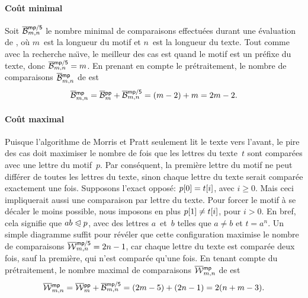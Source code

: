 \paragraph{Coût minimal}

Soit
\(\smash[t]{\OB{\fun{mp/5}}{m,n}}\)
le nombre minimal de comparaisons effectuées durant une évaluation de
, où \(m\)~est la longueur du motif et \(n\)~est la longueur
du texte. Tout comme avec la recherche na\"{\i}ve, le meilleur des cas
est quand le motif est un préfixe du texte, donc
\(\OB{\fun{mp/5}}{m,n} = m\). En prenant en compte le prétraitement,
le nombre de comparaisons
\(\OB{\fun{mp}}{m,n}\) de
 est
\begin{equation*}
\belowdisplayskip=0pt
\OB{\fun{mp}}{m,n} = \OB{\fun{pp}}{m} + \OB{\fun{mp/5}}{m,n} = (m-2)
+ m = 2m - 2.
\end{equation*}

\vspace*{-10pt}

\paragraph{Coût maximal}

Puisque l'algorithme de Morris et Pratt seulement lit le texte vers
l'avant, le pire des cas doit maximiser le nombre de fois que les
lettres du texte~\(t\) sont comparées avec une lettre du
motif~\(p\). Par conséquent, la première lettre du motif ne peut
différer de toutes les lettres du texte, sinon chaque lettre du texte
serait comparée exactement une fois. Supposons l'exact opposé:
\({p}[{0}] = {t}[{i}]\), avec \(i \geqslant 0\). Mais ceci
impliquerait aussi une comparaison par lettre du texte. Pour forcer le
motif à se décaler le moins possible, nous imposons en plus
\({p}[{1}] \neq {t}[{i}]\), pour \(i>0\). En bref, cela signifie
que \(ab \mathrel{\trianglelefteqslant} p\), avec des lettres \(a\)~et~\(b\) telles que \(a
\neq b\) et \(t=a^n\). Un simple diagramme suffit pour révéler que
cette configuration maximise le nombre de comparaisons
\(\OW{\fun{mp/5}}{m,n} = 2n - 1\),
car chaque lettre du texte est comparée deux fois, sauf la première,
qui n'est comparée qu'une fois. En tenant compte du prétraitement, le
nombre maximal de comparaisons \(\OW{\fun{mp}}{m,n}\)
 de  est
\begin{equation*}
\belowdisplayskip=0pt
\OW{\fun{mp}}{m,n} = \OW{\fun{pp}}{m} + \OB{\fun{mp/5}}{m,n} = (2m-5)
+ (2n-1) = 2(n + m - 3).
\end{equation*}

